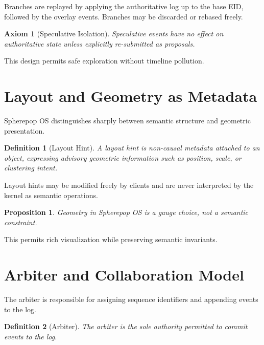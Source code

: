 \documentclass[11pt]{article}
\newtheorem{definition}{Definition}[section]
\newtheorem{axiom}{Axiom}[section]
\newtheorem{proposition}{Proposition}[section]
\begin{document}
Branches are replayed by applying the authoritative log up to the base EID, followed by the overlay events. Branches may be discarded or rebased freely.

\begin{axiom}[Speculative Isolation]
\label{ax:speculative-isolation}
Speculative events have no effect on authoritative state unless explicitly re-submitted as proposals.
\end{axiom}

This design permits safe exploration without timeline pollution.

\section{Layout and Geometry as Metadata}

Spherepop OS distinguishes sharply between semantic structure and geometric presentation.

\begin{definition}[Layout Hint]
A layout hint is non-causal metadata attached to an object, expressing advisory geometric information such as position, scale, or clustering intent.
\end{definition}

Layout hints may be modified freely by clients and are never interpreted by the kernel as semantic operations.

\begin{proposition}
Geometry in Spherepop OS is a gauge choice, not a semantic constraint.
\end{proposition}

This permits rich visualization while preserving semantic invariants.

\section{Arbiter and Collaboration Model}

The arbiter is responsible for assigning sequence identifiers and appending events to the log.

\begin{definition}[Arbiter]
The arbiter is the sole authority permitted to commit events to the log.
\end{definition}
\end{document}
